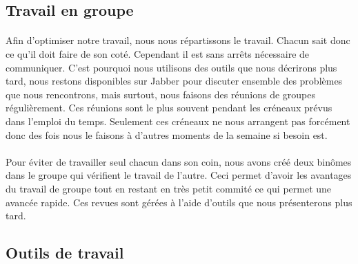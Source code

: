 \subsection{Travail en groupe}

\paragraph{}
Afin d'optimiser notre travail, nous nous répartissons le travail. Chacun sait donc ce qu'il doit faire de son coté. Cependant il est sans arrêts nécessaire de communiquer. C'est pourquoi nous utilisons des outils que nous décrirons plus tard, nous restons disponibles sur Jabber pour discuter ensemble des problèmes que nous rencontrons, mais surtout, nous faisons des réunions de groupes régulièrement. Ces réunions sont le plus souvent pendant les créneaux prévus dans l'emploi du temps. Seulement ces créneaux ne nous arrangent pas forcément donc des fois nous le faisons à d'autres moments de la semaine si besoin est.

\paragraph{}
Pour éviter de travailler seul chacun dans son coin, nous avons créé deux binômes dans le groupe qui vérifient le travail de l'autre. Ceci permet d'avoir les avantages du travail de groupe tout en restant en très petit commité ce qui permet une avancée rapide. Ces revues sont gérées à l'aide d'outils que nous présenterons plus tard.

\subsection{Outils de travail}


